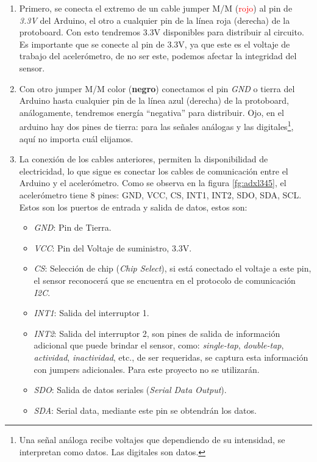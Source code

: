 \documentclass[10pt, a4paper, twocolumn]{article} %
\begin{document}
\begin{enumerate}
    \item Primero, se conecta el extremo de un cable jumper M/M (\textcolor{red}{rojo}) al pin de \textit{3.3V} del Arduino, el otro a cualquier pin de la línea roja (derecha) de la protoboard. Con esto tendremos 3.3V disponibles para distribuir al circuito. Es importante que se conecte al pin de 3.3V, ya que este es el voltaje de trabajo del acelerómetro, de no ser este, podemos afectar la integridad del sensor.
    \item Con otro jumper M/M color (\textbf{negro}) conectamos el pin \textit{GND} o tierra del Arduino hasta cualquier pin de la línea azul (derecha) de la protoboard, análogamente, tendremos energía ``negativa'' para distribuir. Ojo, en el arduino hay dos pines de tierra: para las señales análogas y las digitales\footnote{Una señal análoga recibe voltajes que dependiendo de su intensidad, se interpretan como datos. Las digitales son datos.}, aquí no importa cuál elijamos.
    \item   La conexión de los cables anteriores, permiten la disponibilidad de electricidad, lo que sigue es conectar los cables de comunicación entre el Arduino y el acelerómetro. Como se observa en la figura \ref{fg:adxl345}, el acelerómetro tiene 8 pines: GND, VCC, CS, INT1, INT2, SDO, SDA, SCL. Estos son los puertos de entrada y salida de datos, estos son:
    \begin{itemize}     
        \item \textit{GND}: Pin de Tierra.
        \item \textit{VCC}: Pin del Voltaje de suministro, 3.3V.
        \item \textit{CS}: Selección de chip (\textit{Chip Select}), si está conectado el voltaje a este pin, el sensor reconocerá que se encuentra en el protocolo de comunicación \textit{I2C}.
        \item \textit{INT1}: Salida del interruptor 1.
        \item \textit{INT2}: Salida del interruptor 2, son pines de salida de información adicional que puede brindar el sensor, como: \textit{single-tap}, \textit{double-tap}, \textit{actividad}, \textit{inactividad}, etc., de ser requeridas, se captura esta información con jumpers adicionales. Para este proyecto no se utilizarán.
		\item \textit{SDO}: Salida de datos seriales (\textit{Serial Data Output}).
        \item \textit{SDA}: Serial data, mediante este pin se obtendrán los datos.

\end{itemize}
\end{enumerate}
\end{document}
